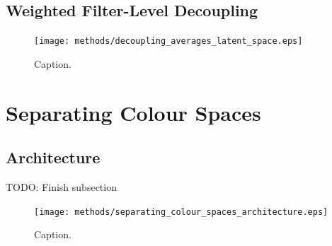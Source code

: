 %
%
\subsection{Weighted Filter-Level Decoupling}
\begin{figure}[H]
\centering
\captionsetup{justification=centering}
\texttt{[image: methods/decoupling\_averages\_latent\_space.eps]}
\caption{Caption.}
\label{fig:decoupling_averages_latent_space}
\end{figure}



%
%
%
%
%
\section{Separating Colour Spaces}
\subsection{Architecture}
TODO: Finish subsection

\begin{figure}[h!]
\centering
\captionsetup{justification=centering}
\texttt{[image: methods/separating\_colour\_spaces\_architecture.eps]}
\caption{Caption.}
\label{fig:separating_colour_spaces_architecture}
\end{figure}

